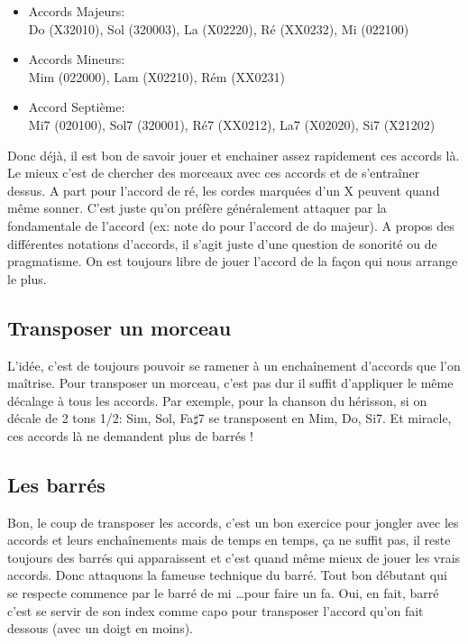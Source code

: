\documentclass[a4paper,twoside]{article}
\begin{document}
\begin{itemize}
\item Accords Majeurs:\\ 
  Do (X32010), Sol (320003), La (X02220), Ré (XX0232), Mi (022100)\\
\item Accords Mineurs:\\
  Mim (022000), Lam (X02210), Rém (XX0231)\\
\item Accord Septième:\\
  Mi7 (020100), Sol7 (320001), Ré7 (XX0212), La7 (X02020), Si7 (X21202)\\
\end{itemize}

Donc déjà, il est bon de savoir jouer et enchainer assez rapidement
ces accords là. Le mieux c'est de chercher des morceaux avec ces
accords et de s'entraîner dessus.  A part pour l'accord de ré, les
cordes marquées d'un X peuvent quand même sonner.  C'est juste qu'on
préfère généralement attaquer par la fondamentale de l'accord (ex:
note do pour l'accord de do majeur).  A propos des différentes
notations d'accords, il s'agit juste d'une question de sonorité ou de
pragmatisme. On est toujours libre de jouer l'accord de la façon qui
nous arrange le plus.

\subsection{Transposer un morceau}

L'idée, c'est de toujours pouvoir se ramener à un enchaînement
d'accords que l'on maîtrise.  Pour transposer un morceau, c'est pas
dur il suffit d'appliquer le même décalage à tous les accords.  Par
exemple, pour la chanson du hérisson, si on décale de 2 tons 1/2: Sim,
Sol, Fa$\sharp$7 se transposent en Mim, Do, Si7.  Et miracle, ces
accords là ne demandent plus de barrés !

\subsection{Les barrés}

Bon, le coup de transposer les accords, c'est un bon exercice pour
jongler avec les accords et leurs enchaînements mais de temps en
temps, ça ne suffit pas, il reste toujours des barrés qui apparaissent
et c'est quand même mieux de jouer les vrais accords. Donc attaquons
la fameuse technique du barré. Tout bon débutant qui se respecte
commence par le barré de mi \dots pour faire un fa. Oui, en fait,
barré c'est se servir de son index comme capo pour transposer l'accord
qu'on fait dessous (avec un doigt en moins).
\end{document}
